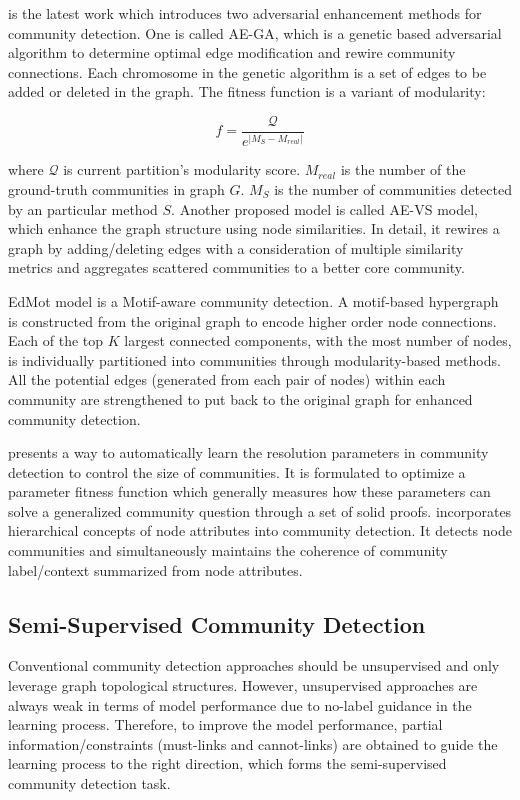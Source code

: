 \cite{zhou2019adversarial} is the latest work which introduces two adversarial enhancement methods for community detection. One is called AE-GA, which is a genetic based adversarial algorithm to determine optimal edge modification and rewire community connections. Each chromosome in the genetic algorithm is a set of edges to be added or deleted in the graph. The fitness function is a variant of modularity:

\begin{equation}
f = \frac{\mathcal{Q}}{e^{|M_S - M_{real}|}}
\end{equation}  

where $\mathcal{Q}$ is current partition's modularity score. $M_{real}$ is the number of the ground-truth communities in graph $G$. $M_S$ is the number of communities detected by an particular method $S$. Another proposed model is called AE-VS model, which enhance the graph structure using node similarities. In detail, it rewires a graph by adding/deleting edges with a consideration of multiple similarity metrics and aggregates scattered communities to a better core community.

EdMot model \cite{li2019edmot} is a Motif-aware community detection. A motif-based hypergraph is constructed from the original graph to encode higher order node connections. Each of the top $K$ largest connected components, with the most number of nodes, is individually partitioned into communities through modularity-based methods. All the potential edges (generated from each pair of nodes) within each community are strengthened to put back to the original graph for enhanced community detection. 

\cite{veldt2019learning} presents a way to automatically learn the resolution parameters in community detection to control the size of communities. It is formulated to optimize a parameter fitness function which generally measures how these parameters can solve a generalized community question through a set of solid proofs. \cite{bhatt2019knowledge} incorporates hierarchical concepts of node attributes  into community detection. It detects node communities and simultaneously maintains the coherence of community label/context  summarized from node attributes. 

\subsection{Semi-Supervised Community Detection}
Conventional community detection approaches should be unsupervised and only leverage graph topological structures. However, unsupervised approaches are always weak in terms of model performance due to no-label guidance in the learning process. Therefore, to improve the model performance, partial information/constraints (must-links and cannot-links) are obtained to guide the learning process to the right direction, which forms the semi-supervised community detection task. 

